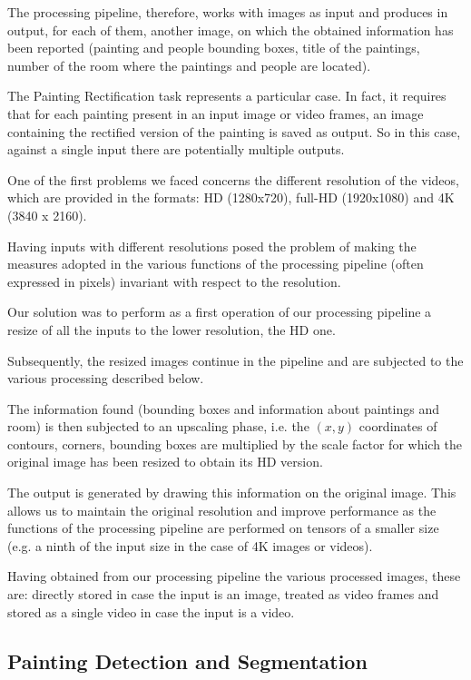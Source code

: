 \documentclass[10pt,twocolumn,letterpaper]{article}
\begin{document}
The processing pipeline, therefore, works with images as input and produces in output, for each of them, another image, on which the obtained information has been reported (painting and people bounding boxes, title of the paintings, number of the room where the paintings and people are located).

The Painting Rectification task represents a particular case. In fact, it requires that for each painting present in an input image or video frames, an image containing the rectified version of the painting is saved as output. So in this case, against a single input there are potentially multiple outputs.

One of the first problems we faced concerns the different resolution of the videos, which are provided in the formats: HD (1280x720), full-HD (1920x1080) and 4K (3840 x 2160).

Having inputs with different resolutions posed the problem of making the measures adopted in the various functions of the processing pipeline (often expressed in pixels) invariant with respect to the resolution.

Our solution was to perform as a first operation of our processing pipeline a resize of all the inputs to the lower resolution, the HD one.

Subsequently, the resized images continue in the pipeline and are subjected to the various processing described below.

The information found (bounding boxes and information about paintings and room) is then subjected to an upscaling phase, i.e. the $(x, y)$ coordinates of contours, corners, bounding boxes are multiplied by the scale factor for which the original image has been resized to obtain its HD version.

The output is generated by drawing this information on the original image. This allows us to maintain the original resolution and improve performance as the functions of the processing pipeline are performed on tensors of a smaller size (e.g. a ninth of the input size in the case of 4K images or videos). 

Having obtained from our processing pipeline the various processed images, these are: directly stored in case the input is an image, treated as video frames and stored as a single video in case the input is a video.

\subsection{Painting Detection and Segmentation}
\end{document}
